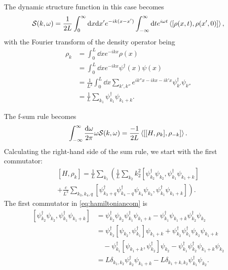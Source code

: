 \documentclass[11pt, a4paper]{report} %
\begin{document}
The dynamic structure function in this case becomes
\begin{equation}
  \label{eq:3}
  \mathcal{S}(k,\omega) = \frac{1}{2L} \int_0^{\infty} \dd x \dd x' e^{-ik(x-x')} \int_{-\infty}^{\infty} \dd t e^{i\omega t} \expval{\left[\rho(x, t), \rho(x',0)\right]},
\end{equation}
with the Fourier transform of the density operator being 
\begin{align}
  \label{eq:4}
  \rho_k &= \int_{0}^{L} \dd x e^{-ikx} \rho(x) \\
         &= \int_{0}^{L} \dd x e^{-ikx} \psi^{\dag}(x) \psi(x)\\
         &= \frac{1}{L^2} \int_{0}^{L} \dd x \sum_{k',k''} e^{ik''x-ikx-ik'x} \psi_{k'}^{\dag} \psi_{k''}\\
         &= \frac{1}{L} \sum_{k_1} \psi_{k_1}^{\dag} \psi_{k_1+k}.
\end{align}

The f-sum rule becomes
\begin{equation}
  \label{eq:5}
  \int_{-\infty}^{\infty} \frac{\dd \omega}{2\pi} \omega\mathcal{S} (k, \omega) = \frac{-1}{2L} \expval{[[H,\rho_k],\rho_{-k}]}.
\end{equation}
Calculating the right-hand side of the sum rule, we start with the first commutator:
\begin{multline}
  \label{eq:hamiltoniancom}
  [H, \rho_k] = \frac{1}{L} \sum_{k_1} \left(\frac{1}{L} \sum_{k_2}k_2^2\left[\psi_{k_2}^{\dag}\psi_{k_2}, \psi_{k_1}^{\dag}\psi_{k_1+k}\right] \right.\\\left.+\frac{c}{L^3} \sum_{k_3, k_4, q} \left[\psi_{k_3+q}^{\dag}\psi_{k_4-q}^{\dag}\psi_{k_4}\psi_{k_3},\psi_{k_1}^{\dag}\psi_{k_1+k}\right]  \right).
\end{multline}
The first commutator in \cref{eq:hamiltoniancom} is 
\begin{align}
  \label{eq:7}
  \left[\psi_{k_2}^{\dag}\psi_{k_2}, \psi_{k_1}^{\dag}\psi_{k_1+k}\right] &= \psi_{k_2}^{\dag}\psi_{k_2} \psi_{k_1}^{\dag}\psi_{k_1+k} - \psi_{k_1}^{\dag}\psi_{k_1+k}\psi_{k_2}^{\dag}\psi_{k_2}\\
                                                                          &= \psi_{k_2}^{\dag}[\psi_{k_2}, \psi_{k_1}^{\dag}]\psi_{k_1+k} +  \psi_{k_2}^{\dag}\psi_{k_1}^{\dag}\psi_{k_2}\psi_{k_1+k}\nonumber\\
                                                                          &\quad- \psi_{k_1}^{\dag}[\psi_{k_1+k},\psi_{k_2}^{\dag}]\psi_{k_2} - \psi_{k_1}^{\dag}\psi_{k_2}^{\dag}\psi_{k_1+k}\psi_{k_2}\\
                                                                          &= L \delta_{k_1,k_2} \psi_{k_2}^{\dag}\psi_{k_1+k} - L \delta_{k_1+k,k_2}\psi_{k_1}^{\dag}\psi_{k_2} .
\end{align}
\end{document}

